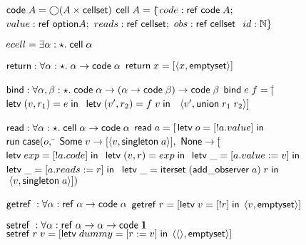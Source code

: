 \begin{figure}
\mbox{}
\begin{specification}
\nextline $\mathsf{code}\;{A} = \bigcirc{(A \times \mathsf{cellset})}$ \nextline[1em]
$\mathsf{cell}\;{A} = \{$\=$code: \mathsf{ref}\;\mathsf{code}\;{A};$ \nextline
                   \>$value: \mathsf{ref}\;\mathsf{option }{A};$ \nextline
                   \>$reads: \mathsf{ref}\;\mathsf{cellset};$ \nextline
                   \>$obs:   \mathsf{ref}\;\mathsf{cellset}\;$ \nextline
                   \>$id:    \mathbb{N}\}$ \nextline[1em]

$ecell = \exists \alpha:\star.\; \mathsf{cell}\;{\alpha}$ \nextline[1em]

$\mathsf{return} : \forall \alpha:\star.\; \alpha \to \mathsf{code}\;{\alpha}$ \nextline
$\mathsf{return}\;x = [\left<{x},{\mathsf{emptyset}}\right>]$ \nextline[1em]

$\mathsf{bind} : \forall \alpha,\beta:\star.\; \mathsf{code}\;{\alpha} \to (\alpha \to \mathsf{code}\;{\beta}) \to \mathsf{code}\;{\beta}$ \nextline
$\mathsf{bind}\;e\;f = [$\=$\mathsf{letv}\;(v,r_1) = e\;\mathsf{in}\;$ \nextline
                        \>$\mathsf{letv}\;(v',r_2) = f\;v\;\mathsf{in}\;$ \nextline
                        \>$\;\left<{v'},{\mathsf{union}\;r_1\;r_2}\right>]$\nextline[1em]

$\mathsf{read} : \forall \alpha:\star.\; \mathsf{cell}\;{\alpha} \to \mathsf{code}\;{\alpha}$ \nextline
$\mathsf{read}\;a = [$\=$\mathsf{letv}\;o = [!a.value]\;\mathsf{in}\;$ \nextline
                     \>$\mathsf{run}\;\mathsf{case}(o,$ \nextline
                     \>\qquad\= $\mathsf{Some}\;v \to [\left<{v},{\mathsf{singleton}\;a}\right>],$ \nextline
                     \>      \> $\mathsf{None} \to [$\=$\mathsf{letv}\;exp = [!a.code]\;\mathsf{in}\;$ \nextline
                     \>      \>                     \>$\mathsf{letv}\;(v,r) = exp\;\mathsf{in}\;$ \nextline
                     \>      \>                     \>$\mathsf{letv}\;\_ = [a.value := v]\;\mathsf{in}\;$\nextline
                     \>      \>                     \>$\mathsf{letv}\;\_ = [a.reads := r]\;\mathsf{in}\;$ \nextline
                     \>      \>                     \>$\mathsf{letv}\;\_ = \mathsf{iterset}\;(\mathsf{add\_observer}\;a)\;r\;\mathsf{in}\;$ \nextline
                     \>      \>                     \>$\;\left<{v},{\mathsf{singleton}\;a}\right>])$ \nextline[1em]

$\mathsf{getref}\; : \forall \alpha : \mathsf{ref}\;\alpha \to \mathsf{code}\;{\alpha}$ \nextline
$\mathsf{getref}\; r = [\mathsf{letv}\;v = [!r]\;\mathsf{in}\;\left<{v},{\mathsf{emptyset}}\right>]$ \nextline[1em]

$\mathsf{setref}\; : \forall \alpha : \mathsf{ref}\;\alpha \to \alpha \to \mathsf{code}\;{\mathbf{1}}$ \nextline
$\mathsf{setref}\; r\;v = [\mathsf{letv}\;dummy = [r := v]\;\mathsf{in}\;\left<{\left<\right>},{\mathsf{emptyset}}\right>]$ \nextline[1em]


\end{specification}
\end{figure}
